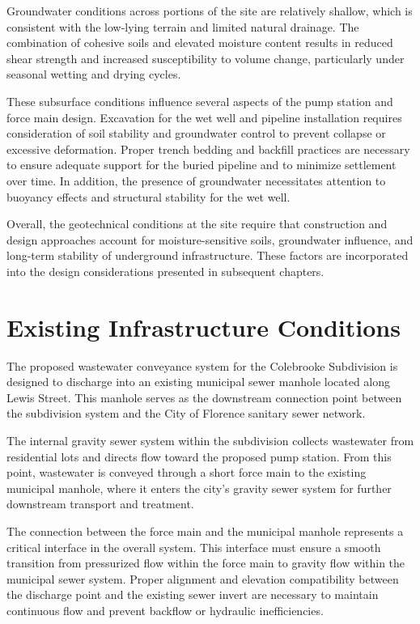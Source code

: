 Groundwater conditions across portions of the site are relatively shallow, which is consistent with the low-lying terrain and limited natural drainage. The combination of cohesive soils and elevated moisture content results in reduced shear strength and increased susceptibility to volume change, particularly under seasonal wetting and drying cycles.

These subsurface conditions influence several aspects of the pump station and force main design. Excavation for the wet well and pipeline installation requires consideration of soil stability and groundwater control to prevent collapse or excessive deformation. Proper trench bedding and backfill practices are necessary to ensure adequate support for the buried pipeline and to minimize settlement over time. In addition, the presence of groundwater necessitates attention to buoyancy effects and structural stability for the wet well.

Overall, the geotechnical conditions at the site require that construction and design approaches account for moisture-sensitive soils, groundwater influence, and long-term stability of underground infrastructure. These factors are incorporated into the design considerations presented in subsequent chapters.


\section{Existing Infrastructure Conditions}

The proposed wastewater conveyance system for the Colebrooke Subdivision is designed to discharge into an existing municipal sewer manhole located along Lewis Street. This manhole serves as the downstream connection point between the subdivision system and the City of Florence sanitary sewer network.

The internal gravity sewer system within the subdivision collects wastewater from residential lots and directs flow toward the proposed pump station. From this point, wastewater is conveyed through a short force main to the existing municipal manhole, where it enters the city’s gravity sewer system for further downstream transport and treatment.

The connection between the force main and the municipal manhole represents a critical interface in the overall system. This interface must ensure a smooth transition from pressurized flow within the force main to gravity flow within the municipal sewer system. Proper alignment and elevation compatibility between the discharge point and the existing sewer invert are necessary to maintain continuous flow and prevent backflow or hydraulic inefficiencies.

